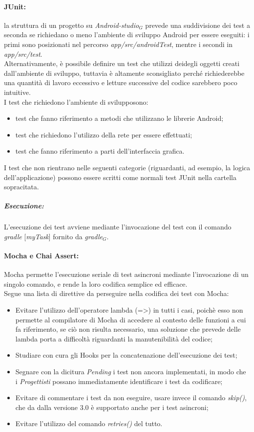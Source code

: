 \paragraph{JUnit:}
la struttura di un progetto su \textit{Android-studio$_{G}$} prevede una suddivisione dei test a seconda se richiedano o meno l'ambiente di sviluppo Android per essere eseguiti: i primi sono posizionati nel percorso \textit{app/src/androidTest}, mentre i secondi in \textit{app/src/test}.\\
Alternativamente, è possibile definire un test che utilizzi deidegli oggetti creati dall'ambiente di sviluppo, tuttavia è altamente sconsigliato perché richiederebbe una quantità di lavoro eccessivo e letture successive del codice sarebbero poco intuitive.\\
I test che richiedono l'ambiente di svilupposono:
\begin{itemize}
	\item test che fanno riferimento a metodi che utilizzano le librerie Android; 
	\item test che richiedono l'utilizzo della rete per essere effettuati; 
	\item test che fanno riferimento a parti dell'interfaccia grafica.
\end{itemize}
I test che non rientrano nelle seguenti categorie (riguardanti, ad esempio, la logica dell'applicazione) possono essere scritti come normali test JUnit nella cartella sopracitata.
\subparagraph{Esecuzione:} L'esecuzione dei test avviene mediante l'invocazione del test con il comando \textit{gradle} [\textit{myTask}] fornito da \textit{gradle$_{G}$}. 

\paragraph{Mocha e Chai Assert:} Mocha permette l'esecuzione seriale di test asincroni mediante l'invocazione di un singolo comando, e rende la loro codifica semplice ed efficace.\\
Segue una lista di direttive da perseguire nella codifica dei test con Mocha:
\begin{itemize}
	\item Evitare l'utilizzo dell'operatore lambda (=>) in tutti i casi, poichè esso non permette al compilatore di Mocha di accedere al contesto delle funzioni a cui fa riferimento, se ciò non risulta necessario, una soluzione che prevede delle lambda porta a difficoltà riguardanti la manutenibilità del codice;
	\item Studiare con cura gli Hooks per la concatenazione dell'esecuzione dei test;
	\item Segnare con la dicitura \textit{Pending} i test non ancora implementati, in modo che i \textit{Progettisti} possano immediatamente identificare i test da codificare;
	\item Evitare di commentare i test da non eseguire, usare invece il comando \textit{skip()}, che da dalla versione 3.0 è supportato anche per i test asincroni;
	\item Evitare l'utilizzo del comando \textit{retries()} del tutto.
\end{itemize}


